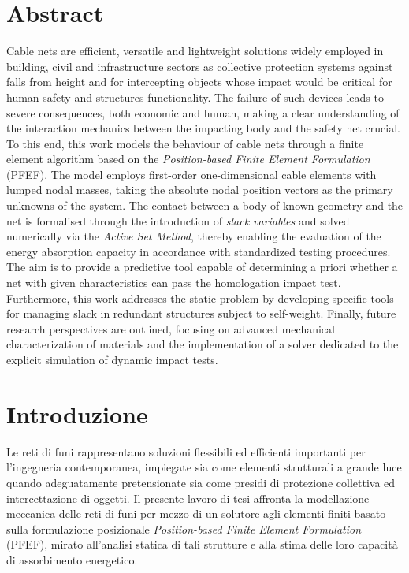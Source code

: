 \documentclass[12pt,a4paper]{report}
\numberwithin{figure}{chapter}
\numberwithin{table}{chapter}
\begin{document}
\chapter*{Abstract}
Cable nets are efficient, versatile and lightweight solutions widely employed in building, civil and infrastructure sectors as collective protection systems against falls from height and for intercepting objects whose impact would be critical for human safety and structures functionality. The failure of such devices leads to severe consequences, both economic and human, making a clear understanding of the interaction mechanics between the impacting body and the safety net crucial. To this end, this work models the behaviour of cable nets through a finite element algorithm based on the \textit{Position-based Finite Element Formulation} (PFEF). The model employs first-order one-dimensional cable elements with lumped nodal masses, taking the absolute nodal position vectors as the primary unknowns of the system. The contact between a body of known geometry and the net is formalised through the introduction of \textit{slack variables} and solved numerically via the \textit{Active Set Method}, thereby enabling the evaluation of the energy absorption capacity in accordance with standardized testing procedures. The aim is to provide a predictive tool capable of determining a priori whether a net with given characteristics can pass the homologation impact test. Furthermore, this work addresses the static problem by developing specific tools for managing slack in redundant structures subject to self-weight. Finally, future research perspectives are outlined, focusing on advanced mechanical characterization of materials and the implementation of a solver dedicated to the explicit simulation of dynamic impact tests. 

\newpage
\thispagestyle{empty}
\mbox{}
\newpage

\tableofcontents
\clearpage


\clearpage


\chapter*{Introduzione}
Le reti di funi rappresentano soluzioni flessibili ed efficienti importanti per l'ingegneria contemporanea, impiegate sia come elementi strutturali a grande luce quando adeguatamente pretensionate sia come presidi di protezione collettiva ed intercettazione di oggetti. Il presente lavoro di tesi affronta la modellazione meccanica delle reti di funi per mezzo di un solutore agli elementi finiti basato sulla formulazione posizionale \textit{Position-based Finite Element Formulation} (PFEF), mirato all'analisi statica di tali strutture e alla stima delle loro capacità di assorbimento energetico. 
\end{document}
